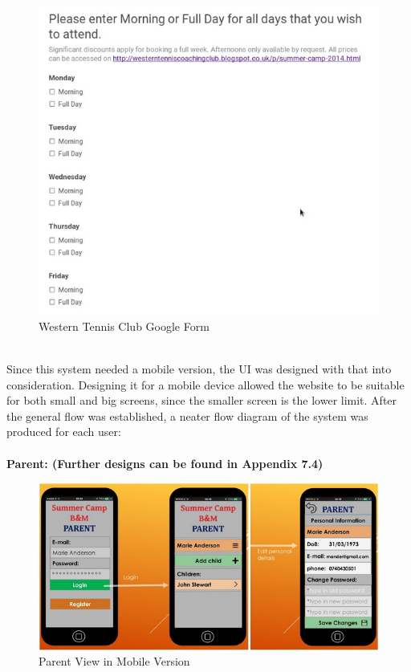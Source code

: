 \documentclass{l3proj}
\begin{document}
\\
{
\begin{figure}[h]
\caption{Western Tennis Club Google Form}
\centering
\includegraphics[scale=.5]{googleDocsForm.jpg}
\end{figure}
}
\\
Since this system needed a mobile version, the UI was designed with that into consideration. Designing it for a mobile device allowed the website to be suitable for both small and big screens, since the smaller screen is the lower limit. After the general flow was established, a neater flow diagram of the system was produced for each user:\\
\\ \textbf{Parent: (Further designs can be found in Appendix 7.4)}\\
{
\begin{figure}[h]
\caption{Parent View in Mobile Version}
\centering
\includegraphics[scale=0.65]{diagramdraft2Parent.jpg}
\end{figure}
}
\end{document}
